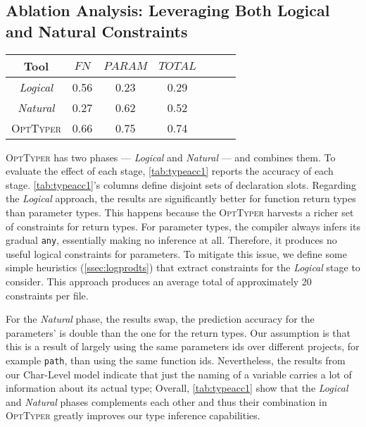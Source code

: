 \documentclass[acmsmall, review, anonymous]{acmart}\settopmatter{printfolios=true,printccs=false,printacmref=false}
\newcommand{\projectname}{\textsc{OptTyper}\xspace}
\begin{document}
\subsection{Ablation Analysis:  Leveraging Both Logical and Natural Constraints}\label{ssec:ablation}

\begin{table*}[t]
	\centering
	\caption{Ablation analysis of \projectname, the cells report accuracy; FN refers to return types of functions and PARAM
	represents parameters.}
\label{tab:typeacc1}
	\begin{tabular}{ccccccc}
		\toprule
		Tool  & $\textit{FN}$ & 
		$\textit{PARAM}$ & $\textit{TOTAL}$ \\
		
		\midrule
		\textit{Logical}      & 0.56                                   & 0.23                                 & 0.29                                  \\
		\textit{Natural}      & 0.27                                    & 0.62                                 & 0.52                                   \\
		\projectname  & 0.66         & 0.75         & 0.74\\
		\bottomrule
	\end{tabular}
\end{table*}
\projectname has two phases --- \textit{Logical} and \textit{Natural} --- and combines them.  To evaluate the effect of each stage, \cref{tab:typeacc1} reports the accuracy of each stage.
\cref{tab:typeacc1}'s columns define disjoint sets of declaration slots.
Regarding the \textit{Logical} approach, the results are significantly better for function return types
than parameter types.
This happens because the \projectname harvests a richer set of constraints for return types.
For parameter types, the compiler always 
infers its gradual \texttt{\small{any}}, essentially making no inference at all. Therefore, it produces no useful logical constraints for parameters.
To mitigate this issue, we define some simple heuristics (\cref{ssec:logprodts}) that extract constraints for the \textit{Logical} stage to consider. This approach produces an average total of approximately 20 constraints per file. 

For the \textit{Natural} phase, the results swap, the prediction accuracy for the parameters' is double than the one for the return types. Our assumption is that
this is a result of largely using the same parameters ids over different projects, for example \lstinline{path}, than using the same function ids. Nevertheless, the results from our Char-Level model indicate that just the naming of a variable carries a
lot of information about its actual type;   
Overall, \cref{tab:typeacc1} show that the \textit{Logical} and \textit{Natural} phases complements each other and thus their combination in \projectname greatly improves our type inference capabilities.
\end{document}
